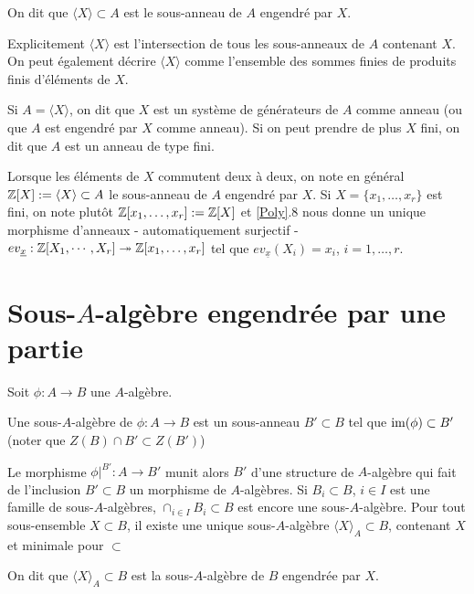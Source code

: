 \begin{definition}On dit que $\langle X\rangle\subset A$ est le sous-anneau de $A$ engendré par $X$.\end{definition}

	Explicitement $\langle X\rangle$ est l'intersection de tous les sous-anneaux de $A$ contenant $X$. On peut également décrire $\langle X\rangle$ comme  l'ensemble des sommes finies de produits finis d'éléments de $X$.

\begin{definition}Si $A=\langle X\rangle$, on dit que $X$ est un système de générateurs de $A$ comme anneau (ou que $A$ est engendré par $X$ comme anneau). Si on peut prendre de plus $X$ fini, on dit que $A$ est un anneau de type fini.\end{definition}

\begin{definition}Lorsque les éléments de $X$ commutent deux à deux, on note en général $\mathbb{Z}[X]:=\langle X\rangle \subset A$ le sous-anneau de $A$ engendré par $X$. Si  $X=\lbrace x_1,\dots,x_r\rbrace $ est fini, on note plutôt $\mathbb{Z}[x_1,\dots,x_r]:=\mathbb{Z}[X]$ et \ref{Poly}.8  nous donne un unique morphisme d'anneaux - automatiquement  surjectif - $ev_{\underline{x}}:\mathbb{Z}[X_1,\cdots, X_r]\twoheadrightarrow \mathbb{Z}[x_1,\dots,x_r] $ tel que $ev_{\underline{x}}(X_i)=x_i$, $i=1,\dots, r$.\end{definition}

  \section{Sous-$A$-algèbre engendrée par une partie}\label{SousAlg}
  Soit $\phi:A\rightarrow B$ une $A$-algèbre.

  \begin{definition}Une sous-$A$-algèbre de $\phi:A\rightarrow B$ est un sous-anneau $B'\subset B$ tel que $\operatorname{im}(\phi)\subset B'$ (noter que $Z(B)\cap B'\subset Z(B')$)\end{definition}
	  Le morphisme $\phi|^{B'}:A\rightarrow B'$ munit alors $B'$ d'une structure de $A$-algèbre qui fait de l'inclusion $B'\subset B$ un morphisme de $A$-algèbres. Si    $B_i\subset B$, $i\in I$ est une famille de sous-$A$-algèbres, $\cap_{i\in I}B_i\subset B$  est encore une sous-$A$-algèbre. Pour tout sous-ensemble $X\subset B$, il existe
une unique sous-$A$-algèbre $\langle X\rangle_A \subset B$, contenant $X$ et minimale pour $\subset$

	\begin{definition}On dit que $\langle X\rangle_A\subset B$ est la sous-$A$-algèbre de $B$ engendrée par $X$.\end{definition}

